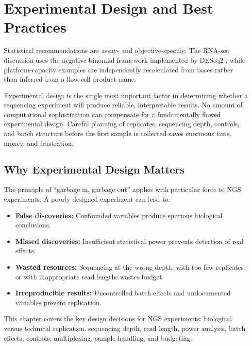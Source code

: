 \chapter{Experimental Design and Best Practices}
\label{ch:expdesign}

\begin{sourcebox}
Statistical recommendations are assay- and objective-specific. The RNA-seq discussion uses the negative-binomial framework implemented by DESeq2 \cite{love2014}, while platform-capacity examples are independently recalculated from bases rather than inferred from a flow-cell product name.
\end{sourcebox}

\begin{keyconcept}
Experimental design is the single most important factor in determining whether a sequencing experiment will produce reliable, interpretable results. No amount of computational sophistication can compensate for a fundamentally flawed experimental design. Careful planning of replicates, sequencing depth, controls, and batch structure before the first sample is collected saves enormous time, money, and frustration.
\end{keyconcept}

\section{Why Experimental Design Matters}
\label{sec:expdesign:why}

The principle of ``garbage in, garbage out'' applies with particular force to NGS experiments. A poorly designed experiment can lead to:

\begin{itemize}[itemsep=2pt]
  \item \textbf{False discoveries:} Confounded variables produce spurious biological conclusions.
  \item \textbf{Missed discoveries:} Insufficient statistical power prevents detection of real effects.
  \item \textbf{Wasted resources:} Sequencing at the wrong depth, with too few replicates, or with inappropriate read lengths wastes budget.
  \item \textbf{Irreproducible results:} Uncontrolled batch effects and undocumented variables prevent replication.
\end{itemize}

This chapter covers the key design decisions for NGS experiments: biological versus technical replication, sequencing depth, read length, power analysis, batch effects, controls, multiplexing, sample handling, and budgeting.

